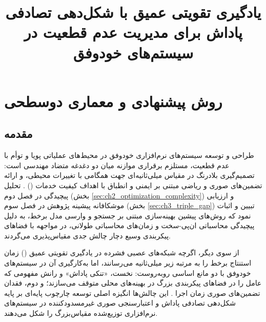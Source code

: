\documentclass[oneside,openany,phd]{TMU-Thesis}
\title{یادگیری تقویتی عمیق با شکل‌دهی تصادفی پاداش برای مدیریت عدم قطعیت در سیستم‌های خودوفق}
\begin{document}
\AutoPersianDigits
{}

\setcounter{chapter}{3}

\chapter{روش پیشنهادی و معماری دوسطحی}
\label{ch:chapter4}
\label{ch:methodology}
\label{ch:chapter5-process}

\section{مقدمه}
\label{sec:ch4_intro}

طراحی و توسعه سیستم‌های نرم‌افزاری خودوفق در محیط‌های عملیاتی پویا و توأم با عدم قطعیت، مستلزم برقراری موازنه میان دو دغدغه متضاد مهندسی است: تصمیم‌گیری بلادرنگ در مقیاس میلی‌ثانیه‌ای جهت همگامی با تغییرات محیطی، و ارائه تضمین‌های صوری و ریاضی مبتنی بر ایمنی و انطباق با اهداف کیفیت خدمات () \cite{weyns2012formal, calinescu2011formal}. تحلیل پیچیدگی در فصل دوم (بخش \ref{sec:ch2_optimization_complexity}) و ارزیابی موشکافانه پیشینه پژوهش در فصل سوم (بخش \ref{sec:ch3_triple_gap}) تبیین و اثبات نمود که روش‌های پیشین بهینه‌سازی مبتنی بر جستجو و وارسی مدل برخط، به دلیل پیچیدگی محاسباتی ان‌پی-سخت \cite{garey1979computers, coker2015sass} و زمان‌های محاسباتی طولانی، در مواجهه با فضاهای پیکربندی وسیع دچار چالش جدی مقیاس‌پذیری می‌گردند.

از سوی دیگر، اگرچه شبکه‌های عصبی فشرده در یادگیری تقویتی عمیق () زمان استنتاج برخط را به مرتبه زیر میلی‌ثانیه می‌رسانند، اما به‌کارگیری آن در سیستم‌های خودوفق با دو مانع اساسی روبه‌روست: نخست، «تنکی پاداش» \cite{du2023alleviating} و رانش مفهومی \cite{gheibi2024dealing} که عامل را در فضاهای پیکربندی بزرگ در بهینه‌های محلی متوقف می‌سازند؛ و دوم، فقدان تضمین‌های صوری زمان اجرا \cite{alshiekh2018safe, camara2020quantitative}. این چالش‌ها انگیزه اصلی توسعه چارچوب پایه‌ای  بر پایه شکل‌دهی تصادفی پاداش و اعتبارسنجی صوری غیرمسدودکننده در سیستم‌های نرم‌افزاری توزیع‌شده مقیاس‌بزرگ \cite{gerostathopoulos2019deltaiot, kavianifar2026rsdrl} را شکل می‌دهند.
\end{document}
